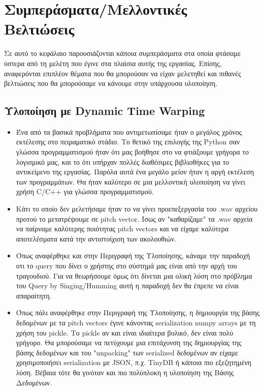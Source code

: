 \section{Συμπεράσματα/Μελλοντικές Βελτιώσεις}
Σε αυτό το κεφάλαιο παρουσιάζονται κάποια συμπεράσματα στα οποία φτάσαμε ύστερα από τη μελέτη που έγινε στα
πλαίσια αυτής της εργασίας. Επίσης, αναφερόνται επιπλέον θέματα που θα μπορούσαν να είχαν μελετηθεί 
και πιθανές βελτιώσεις που θα μπορούσαμε να κάνουμε στην υπάρχουσα υλοποίηση.

\subsection{Υλοποίηση με Dynamic Time Warping}
\begin{itemize}
  \item Ένα από τα βασικά προβλήματα που αντιμετωπίσαμε ήταν ο μεγάλος χρόνος εκτέλεσης στο πειραματικό
  στάδιο. Το θετικό της επιλογής της Python σαν γλώσσα προγραμματισμού ήταν ότι μας βοήθησε στο να φτιάξουμε γρήγορα το λογισμικό μας, και το ότι υπήρχαν πολλές διαθέσιμες βιβλιοθήκες για το αντικείμενο της εργασίας.
  Παρόλα αυτά ένα μεγάλο μείον ήταν η αργή εκτέλεση των προγραμμάτων. Θα ήταν καλύτερο σε μια μελλοντική υλοποίηση να γίνει χρήση C/C++ για γλώσσα προγραμματισμού.
  
  \item Κάτι το οποίο δεν μελετήσαμε ήταν το να γίνει προεπεξεργασία του .wav αρχείου προτού το μετατρέψουμε
  σε pitch vector. Ίσως αν "καθαρίζαμε" τα .wav αρχεία να παίρναμε καλύτερης ποιότητας pitch vectors και να 
  είχαμε καλύτερα αποτελέσματα κατά την αντιστοίχιση των ακολουθιών. 

  \item Όπως αναφέρθηκε και στην Περιγραφή της Υλοποίησης, κάναμε την παραδοχή οτι το query που δίνει ο χρήστης στο σύστημά μας είναι από την αρχή του τραγουδιού. Για να θεωρήσουμε όμως ότι δίνεται μια ολική 
  λύση στο πρόβλημα του Query by Singing/Humming αυτή η παραδοχή δεν θα έπρεπε να είναι απαραίτητη.

  \item Όπως πάλι αναφέρθηκε στην Περιγραφή της Υλοποίησης, η δημιουργία της βάσης δεδομένων με τα pitch
  vectors έγινε κάνοντας serialization numpy arrays με τη χρήση του pickle. Το pickle αν και είναι ιδιαίτερα 
  βολικό, δεν είναι πολύ γρήγορο. Θα μπορούσαμε να πετύχουμε μια επιτάχυνση της δημιουργίας της βάσης δεδομένων και του "unpacking" των serialized δεδομένων αν είχαμε χρησιμοποιήσει serialization με JSON, π.χ. TinyDB \cite{tinydb} ή κάποια πιο εξεζητημένη λύση. Βέβαια τότε θα γινόταν και πιο πολύπλοκη η υλοποίηση της Βάσης Δεδομένων.


\end{itemize}
